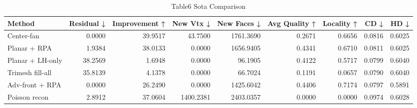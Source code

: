 \begin{table}
\caption{Table6 Sota Comparison}
\label{tab:table6_sota_comparison}
\begin{tabular}{lrrrrrrrr}
\toprule
Method & Residual ↓ & Improvement ↑ & New Vtx ↓ & New Faces ↓ & Avg Quality ↑ & Locality ↑ & CD ↓ & HD ↓ \\
\midrule
Center-fan & 0.0000 & 39.9517 & 43.7500 & 1761.3690 & 0.2671 & 0.6656 & 0.0816 & 0.6025 \\
Planar + RPA & 1.9384 & 38.0133 & 0.0000 & 1656.9405 & 0.4341 & 0.6710 & 0.0811 & 0.6025 \\
Planar + LH-only & 38.2569 & 1.6948 & 0.0000 & 96.1905 & 0.4122 & 0.5717 & 0.0799 & 0.6040 \\
Trimesh fill-all & 35.8139 & 4.1378 & 0.0000 & 66.7024 & 0.1191 & 0.0657 & 0.0790 & 0.6040 \\
Adv-front + RPA & 0.0000 & 26.2490 & 0.0000 & 1425.6042 & 0.4406 & 0.7174 & 0.0797 & 0.5891 \\
Poisson recon & 2.8912 & 37.0604 & 1400.2381 & 2403.0357 & 0.0000 & 0.0000 & 0.0974 & 0.6028 \\
\bottomrule
\end{tabular}
\end{table}
